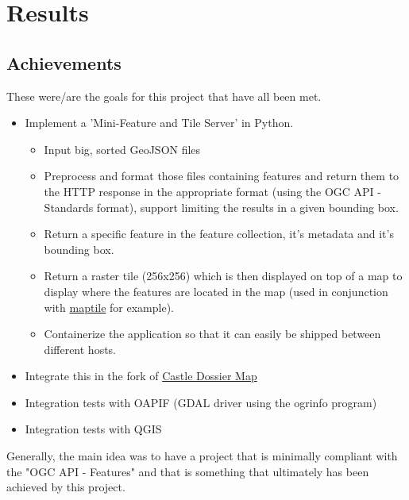 \chapter{Results}

\section{Achievements}
These were/are the goals for this project that have all been met.\\
\begin{itemize}
	\item Implement a 'Mini-Feature and Tile Server' in Python.
	\begin{itemize}
		\item Input big, sorted GeoJSON files
		\item Preprocess and format those files containing features and return them to the HTTP response in the appropriate format (using the OGC API - Standards format), support limiting the results in a given bounding box.
		\item Return a specific feature in the feature collection, it's metadata and it's bounding box.
		\item Return a raster tile (256x256) which is then displayed on top of a map to display where the features are located in the map (used in conjunction with \href{maptile.com}{maptile} for example).
		\item Containerize the application so that it can easily be shipped between different hosts.
	\end{itemize}
	\item Integrate this in the fork of \href{https://gitlab.com/geometalab/castle-map}{Castle Dossier Map}
	\item Integration tests with OAPIF (GDAL driver using the ogrinfo program)
	\item Integration tests with QGIS
\end{itemize}
Generally, the main idea was to have a project that is minimally compliant with the "OGC API - Features" and that is something that ultimately has been achieved by this project.
\newpage
